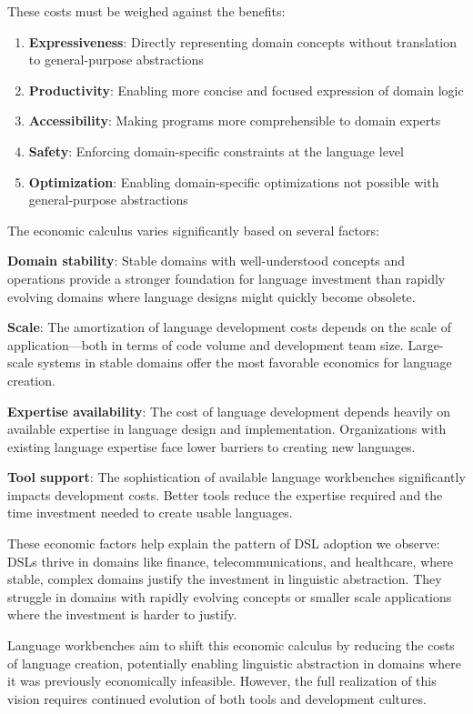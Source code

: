 \documentclass[11pt]{article}
\begin{document}
These costs must be weighed against the benefits:

\begin{enumerate}
\item \textbf{Expressiveness}: Directly representing domain concepts without translation to general-purpose abstractions
\item \textbf{Productivity}: Enabling more concise and focused expression of domain logic
\item \textbf{Accessibility}: Making programs more comprehensible to domain experts
\item \textbf{Safety}: Enforcing domain-specific constraints at the language level
\item \textbf{Optimization}: Enabling domain-specific optimizations not possible with general-purpose abstractions
\end{enumerate}

The economic calculus varies significantly based on several factors:

\textbf{Domain stability}: Stable domains with well-understood concepts and operations provide a stronger foundation for language investment than rapidly evolving domains where language designs might quickly become obsolete.

\textbf{Scale}: The amortization of language development costs depends on the scale of application—both in terms of code volume and development team size. Large-scale systems in stable domains offer the most favorable economics for language creation.

\textbf{Expertise availability}: The cost of language development depends heavily on available expertise in language design and implementation. Organizations with existing language expertise face lower barriers to creating new languages.

\textbf{Tool support}: The sophistication of available language workbenches significantly impacts development costs. Better tools reduce the expertise required and the time investment needed to create usable languages.

These economic factors help explain the pattern of DSL adoption we observe: DSLs thrive in domains like finance, telecommunications, and healthcare, where stable, complex domains justify the investment in linguistic abstraction. They struggle in domains with rapidly evolving concepts or smaller scale applications where the investment is harder to justify.

Language workbenches aim to shift this economic calculus by reducing the costs of language creation, potentially enabling linguistic abstraction in domains where it was previously economically infeasible. However, the full realization of this vision requires continued evolution of both tools and development cultures.
\end{document}
